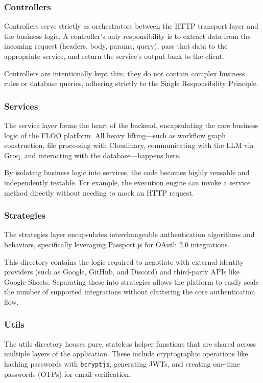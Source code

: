 \subsubsection{Controllers}
Controllers serve strictly as orchestrators between the HTTP transport layer and the business logic. A controller's only responsibility is to extract data from the incoming request (headers, body, params, query), pass that data to the appropriate service, and return the service's output back to the client.

Controllers are intentionally kept thin; they do not contain complex business rules or database queries, adhering strictly to the Single Responsibility Principle.

\subsubsection{Services}
The service layer forms the heart of the backend, encapsulating the core business logic of the FLOO platform. All heavy lifting—such as workflow graph construction, file processing with Cloudinary, communicating with the LLM via Groq, and interacting with the database—happens here.

By isolating business logic into services, the code becomes highly reusable and independently testable. For example, the execution engine can invoke a service method directly without needing to mock an HTTP request.

\subsubsection{Strategies}
The strategies layer encapsulates interchangeable authentication algorithms and behaviors, specifically leveraging Passport.js for OAuth 2.0 integrations. 

This directory contains the logic required to negotiate with external identity providers (such as Google, GitHub, and Discord) and third-party APIs like Google Sheets. Separating these into strategies allows the platform to easily scale the number of supported integrations without cluttering the core authentication flow.

\subsubsection{Utils}
The utils directory houses pure, stateless helper functions that are shared across multiple layers of the application. These include cryptographic operations like hashing passwords with \texttt{bcryptjs}, generating JWTs, and creating one-time passwords (OTPs) for email verification.

